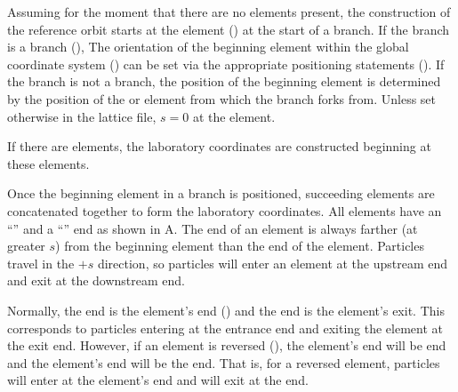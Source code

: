 Assuming for the moment that there are no  elements present, the construction of the
reference orbit starts at the  element () at the start of a
branch. If the branch is a  branch (), The orientation of the beginning
element within the global coordinate system () can be set via the appropriate
positioning statements (). If the branch is not a  branch, the position
of the beginning element is determined by the position of the  or  element
from which the branch forks from. Unless set otherwise in the lattice file, $s = 0$ at the
 element.

If there are  elements, the laboratory coordinates are constructed beginning at these
elements.

Once the beginning element in a branch is positioned, succeeding elements are concatenated together
to form the laboratory coordinates. All elements have an ``'' and a ``''
end as shown in A. The  end of an element is always farther (at
greater $s$) from the beginning element than the  end of the element.  Particles travel
in the $+s$ direction, so particles will enter an element at the upstream end and exit at the
downstream end.

Normally, the  end is the element's  end () and the
 end is the element's  exit. This corresponds to particles entering at the
entrance end and exiting the element at the exit end. However, if an element is reversed
(), the element's  end will be  end and the element's
 end will be the  end. That is, for a reversed element, particles will
enter at the element's  end and will exit at the  end.


